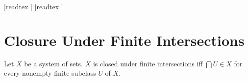 \documentclass[10pt]{article}
\begin{document}
  \begin{imports}
    \begin{forthel}
      [readtex ]
      [readtex ]
    \end{forthel}
  \end{imports}


  \section*{Closure Under Finite Intersections}

  \begin{forthel}
    \begin{definition}
      Let $X$ be a system of sets.
      $X$ is closed under finite intersections iff $\bigcap U \in X$ for every nonempty finite subclass $U$ of $X$.
    \end{definition}
  \end{forthel}
\end{document}
